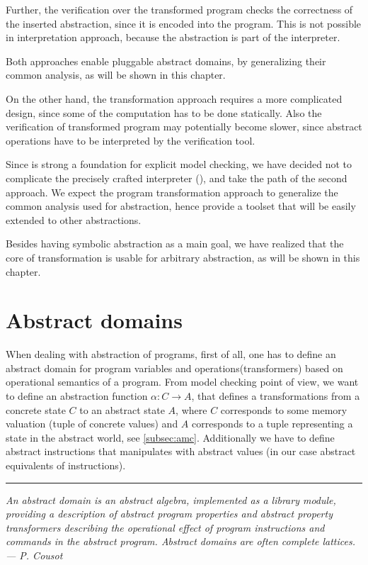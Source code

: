 Further, the verification over the transformed program checks the correctness of
the inserted abstraction, since it is encoded into the program. This is not
possible in interpretation approach, because the abstraction is part of the
interpreter.

Both approaches enable pluggable abstract domains, by generalizing their
common analysis, as will be shown in this chapter.

On the other hand, the transformation approach requires a more complicated
design, since some of the computation has to be done statically. Also the
verification of transformed program may potentially become slower, since
abstract operations have to be interpreted by the verification tool.

Since \DIVINE is strong a foundation for explicit model checking, we have
decided not to complicate the precisely crafted interpreter (\DIVM), and take
the path of the second approach. We expect the program transformation approach
to generalize the common analysis used for abstraction, hence provide a
toolset that will be easily extended to other abstractions.

Besides having symbolic abstraction as a main goal, we have realized that the
core of transformation is usable for arbitrary abstraction, as will be shown in
this chapter.

\section{Abstract domains} \label{sec:absdom}

When dealing with abstraction of programs, first of all, one has to define an
abstract domain for program variables and operations(transformers) based on
operational semantics of a program. From model checking point of view, we want
to define an abstraction function $\alpha \colon C \to A$, that defines a
transformations from a concrete state $C$ to an abstract state $A$, where $C$
corresponds to some memory valuation (tuple of concrete values) and $A$
corresponds to a tuple representing a state in the abstract world, see
\autoref{subsec:amc}. Additionally we have to define abstract instructions that
manipulates with abstract values (in our case abstract equivalents of \LLVM
instructions).

\bigskip

\hrule

\bigskip
\noindent
\textit{An abstract domain is an abstract algebra, implemented as a library module,
providing a description of abstract program properties and abstract property
transformers describing the operational effect of program instructions and
commands in the abstract program. Abstract domains are often complete lattices.
--- P. Cousot \cite{Cousot79} }
\bigskip

